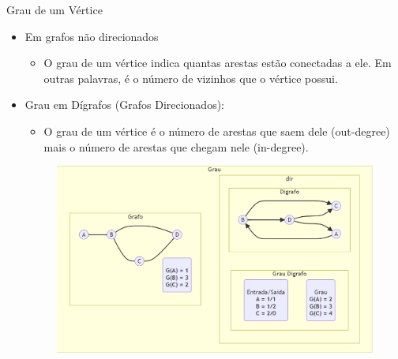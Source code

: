 \documentclass{if-beamer}
\begin{document}
\begin{frame}{Grau de um Vértice} 
\begin{itemize}
\justifying
\item Em grafos não direcionados
\begin{itemize}
\vspace{0.3cm}
\item O grau de um vértice indica quantas arestas estão conectadas a ele. Em outras palavras, é o número de vizinhos que o vértice possui.
\end{itemize}
\item Grau em Dígrafos (Grafos Direcionados):
\begin{itemize}
\vspace{0.3cm}
\item O grau de um vértice é o número de arestas que saem dele (out-degree) mais o número de arestas que chegam nele (in-degree).
\end{itemize}
\begin{figure}
  \centering
  \includegraphics[scale=0.20]{Figuras/exemplos-grafo/h.png}
\end{figure}

\end{itemize} 
\end{frame}
\end{document}
